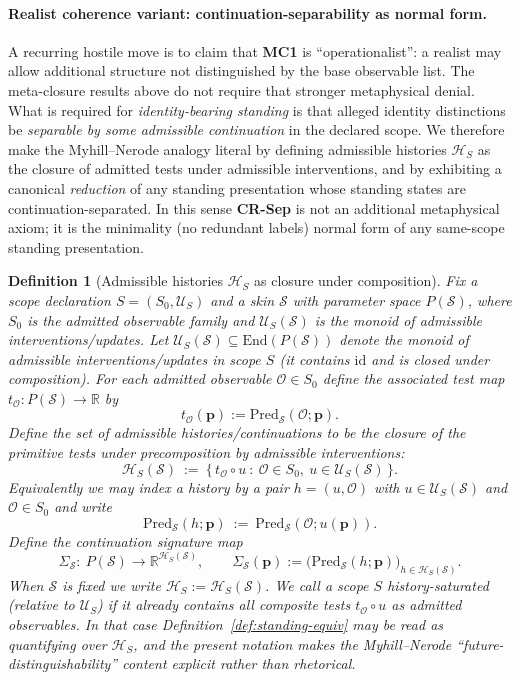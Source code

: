 \documentclass[11pt]{article}
\newtheorem{definition}{Definition}[section]
\theoremstyle{remark}
\newcommand{\Skin}{\mathcal{S}}
\begin{document}
\paragraph{Realist coherence variant: continuation-separability as normal form.}
A recurring hostile move is to claim that \textbf{MC1} is ``operationalist'': a realist may allow additional
structure not distinguished by the base observable list. The meta-closure results above do not require that
stronger metaphysical denial. What is required for \emph{identity-bearing standing} is that alleged identity
distinctions be \emph{separable by some admissible continuation} in the declared scope.
We therefore make the Myhill--Nerode analogy literal by defining admissible histories $\mathcal{H}_S$ as the
closure of admitted tests under admissible interventions, and by exhibiting a canonical \emph{reduction} of any
standing presentation whose standing states are continuation-separated. In this sense \textbf{CR-Sep} is not an
additional metaphysical axiom; it is the minimality (no redundant labels) normal form of any same-scope standing
presentation.

\begin{definition}[Admissible histories $\mathcal{H}_S$ as closure under composition]\label{def:histories}
Fix a scope declaration $S=(S_0,\mathcal{U}_S)$ and a skin $\Skin$ with parameter space $P(\Skin)$, where $S_0$ is the admitted observable family and $\mathcal{U}_S(\Skin)$ is the monoid of admissible interventions/updates.
Let $\mathcal{U}_S(\Skin)\subseteq \mathrm{End}(P(\Skin))$ denote the monoid of admissible
interventions/updates in scope $S$ (it contains $\mathrm{id}$ and is closed under composition).
For each admitted observable $\mathcal{O}\in S_0$ define the associated \emph{test map}
$t_{\mathcal{O}}:P(\Skin)\to\mathbb{R}$ by
\[
t_{\mathcal{O}}(\mathbf{p}) := \mathrm{Pred}_{\Skin}(\mathcal{O};\mathbf{p}).
\]
Define the set of admissible \emph{histories/continuations} to be the closure of the primitive tests under
precomposition by admissible interventions:
\[
\mathcal{H}_S(\Skin)\ :=\ \{\,t_{\mathcal{O}}\circ u\ :\ \mathcal{O}\in S_0,\ u\in\mathcal{U}_S(\Skin)\,\}.
\]
Equivalently we may index a history by a pair $h=(u,\mathcal{O})$ with $u\in\mathcal{U}_S(\Skin)$ and
$\mathcal{O}\in S_0$ and write
\[
\mathrm{Pred}_{\Skin}(h;\mathbf{p})\ :=\ \mathrm{Pred}_{\Skin}(\mathcal{O};u(\mathbf{p})).
\]
Define the \emph{continuation signature} map
\[
\Sigma_{\Skin}:\ P(\Skin)\longrightarrow \mathbb{R}^{\mathcal{H}_S(\Skin)},\qquad
\Sigma_{\Skin}(\mathbf{p}) := \big(\mathrm{Pred}_{\Skin}(h;\mathbf{p})\big)_{h\in\mathcal{H}_S(\Skin)}.
\]
When $\Skin$ is fixed we write $\mathcal{H}_S:=\mathcal{H}_S(\Skin)$.
We call a scope $S$ \emph{history-saturated} (relative to $\mathcal{U}_S$) if it already contains all composite
tests $t_{\mathcal{O}}\circ u$ as admitted observables.
In that case Definition~\ref{def:standing-equiv} may be read as quantifying over $\mathcal{H}_S$, and the present
notation makes the Myhill--Nerode ``future-distinguishability'' content explicit rather than rhetorical.
\end{definition}
\end{document}
